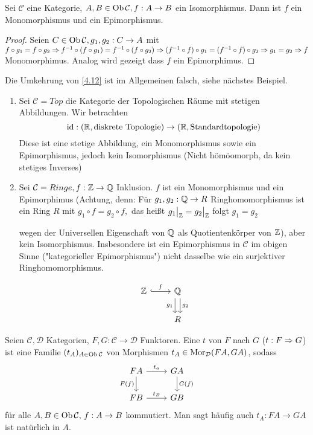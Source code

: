 \begin{bem}\label{4.12}
	Sei $\mathcal{C}$ eine Kategorie, $A,B \in \text{Ob}\,\mathcal{C}, f:A \to B $ ein Isomorphismus. Dann ist $f$ ein Monomorphismus und ein Epimorphismus.
	\begin{proof}
		Seien $ C \in \text{Ob}\,\mathcal{C} , g_1,g_2:C \to A $ mit $ f \circ g_1 = f \circ g_2 \Rightarrow f^{-1} \circ (f \circ g_1) = f^{-1} \circ (f \circ g_2) \Rightarrow (f^{-1} \circ f) \circ g_1 = (f^{-1} \circ f) \circ g_2 \Rightarrow g_1=g_2 \Rightarrow f $ Monomorphimus. Analog wird gezeigt dass $f$ ein Epimorphimus. 
	\end{proof}
\end{bem}
\begin{anm}
	Die Umkehrung von \ref{4.12} ist im Allgemeinen falsch, siehe nächstes Beispiel.
\end{anm}
\begin{bsp}
	\begin{enumerate} [label= \alph*)]
		\item  Sei $\mathcal{C} = Top  $ die Kategorie der Topologischen Räume mit stetigen Abbildungen. Wir betrachten $$\operatorname{id}: (\mathbb{R}, \text{diskrete Topologie}) \to (\mathbb{R}, \text{Standardtopologie})$$ Diese ist eine stetige Abbildung, ein Monomorphismus sowie ein Epimorphismus, jedoch kein Isomorphismus (Nicht hömöomorph, da kein stetiges Inverses)
		\item Sei $\mathcal{C} = Ringe, f:\mathbb{Z} \to \mathbb{Q} $ Inklusion. $f$ ist ein  Monomorphismus und ein Epimorphimus (Achtung, denn: Für $g_1,g_2: \mathbb{Q} \to R$ Ringhomomorphismus ist ein Ring $R$ mit $g_1 \circ f = g_2 \circ f, $ das heißt $ g_1\big|_{\mathbb{Z}} = g_2\big|_{\mathbb{Z}} $ folgt $ g_1 = g_2 $
		 \begin{minipage}[t]{0.7\textwidth}
		 	wegen der Universellen Eigenschaft von $\mathbb{Q}$ als
		 	Quotientenkörper von $\mathbb{Z}$), aber kein Isomorphismus. 
		Insbesondere ist ein Epimorphismus in $\mathcal{C} $ im obigen Sinne  ("kategorieller Epimorphismus") nicht dasselbe wie ein surjektiver Ringhomomorphismus.
		\end{minipage}
		\begin{minipage}[t]{0.3\textwidth} 
			$$\begin{tikzcd}
			\Z \arrow[hook]{r}{f} & \Q \arrow[xshift = 0.7ex]{d}{g_2} \arrow[xshift = -0.7ex, swap]{d}{g_1}\\ & R
			\end{tikzcd}$$
		\end{minipage}
	\end{enumerate}
\end{bsp}
\begin{df}\label{4.14}
	Seien $\mathcal{C}, \mathcal{D}$ Kategorien, $F,G:\mathcal{C} \to \mathcal{D}$ Funktoren. Eine  $t$ von $F$ nach $G$ ($t: F \Rightarrow G$) ist eine Familie $(t_A)_{A\in \text{Ob}\,\mathcal{C}}$ von Morphismen $t_A\in \text{Mor}_{\mathcal{D}}(FA, GA)$, sodass 
	$$\begin{tikzcd}
	FA \arrow{r}{t_a} \arrow[swap]{d}{F(f)}& GA\arrow{d}{G(f)}\\
	FB \arrow{r}{t_B} & GB
	\end{tikzcd}$$
	für alle $A,B \in \text{Ob}\,\mathcal{C}, \, f:A\to B$ kommutiert. Man sagt häufig auch $t_A: FA \to GA$ ist natürlich in $A$.
\end{df}
